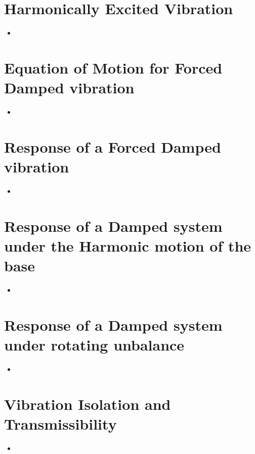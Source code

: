 \documentclass[8pt]{report}
\begin{document}
\section{Harmonically Excited Vibration}
	\begin{itemize}
		\item
	\end{itemize}\hrulefill
\section{Equation of Motion for Forced Damped vibration}
	\begin{itemize}
		\item
	\end{itemize}\hrulefill
\section{Response of a Forced Damped vibration}
	\begin{itemize}
		\item
	\end{itemize}\hrulefill
\section{Response of a Damped system under the Harmonic motion of the base}
	\begin{itemize}
		\item
	\end{itemize}\hrulefill
\section{Response of a Damped system under rotating unbalance}
	\begin{itemize}
		\item
	\end{itemize}\hrulefill
\section{Vibration Isolation and Transmissibility}
	\begin{itemize}
		\item
	\end{itemize}\hrulefill
\end{document}
